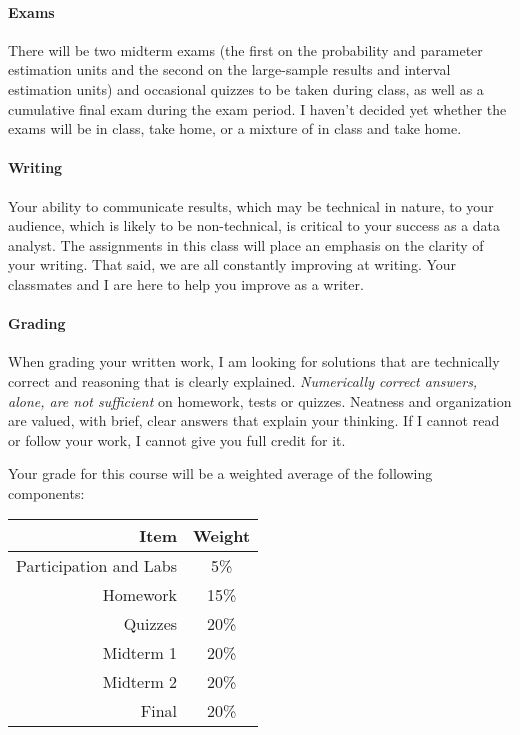 \documentclass[11pt]{article}
\begin{document}
\paragraph{Exams}
There will be two midterm exams (the first on the probability and parameter estimation units and the second on the large-sample results and interval estimation units) and occasional quizzes to be taken during class, as well as a cumulative final exam during the exam period.  I haven't decided yet whether the exams will be in class, take home, or a mixture of in class and take home.

\paragraph{Writing}
Your ability to communicate results, which may be technical in nature, to your audience, which is likely to be non-technical, is critical to your success as a data analyst. The assignments in this class will place an emphasis on the clarity of your writing.  That said, we are all constantly improving at writing.  Your classmates and I are here to help you improve as a writer.

\paragraph{Grading}
When grading your written work, I am looking for solutions that are technically correct and reasoning that is clearly explained.  \emph{Numerically correct answers, alone, are not sufficient} on homework, tests or quizzes.  Neatness and organization are valued, with brief, clear answers that explain your thinking.  If I cannot read or follow your work, I cannot give you full credit for it.

Your grade for this course will be a weighted average of the following components:

\begin{table}[!h]
\centering
\begin{tabular}{r c}
\toprule
Item & Weight \\
\midrule
Participation and Labs & 5\% \\
\cmidrule(r){1-2}
Homework & 15\% \\
\cmidrule(r){1-2}
Quizzes & 20\% \\
\cmidrule(r){1-2}
Midterm 1 & 20\% \\
\cmidrule(r){1-2}
Midterm 2 & 20\% \\
\cmidrule(r){1-2}
Final & 20\% \\
\bottomrule
\end{tabular}
\end{table}
\end{document}
